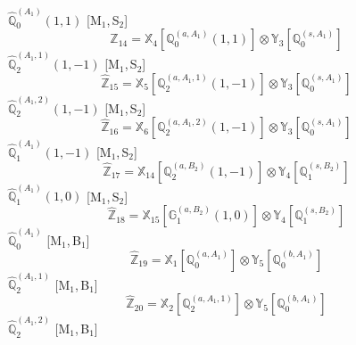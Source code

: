 \documentclass[fleqn,10pt,landscape]{article}
\begin{document}
\begin{itemize}
\noindent {} $\,\,\,\hat{\mathbb{Q}}_{0}^{(A_{1})}(1,1)$ [M$_{1}$,\,S$_{2}$]
\begin{dmath*}
\hat{\mathbb{Z}}_{14}=\mathbb{X}_{4}[\mathbb{Q}_{0}^{(a,A_{1})}(1,1)] \otimes\mathbb{Y}_{3}[\mathbb{Q}_{0}^{(s,A_{1})}]
\end{dmath*}
\vspace{4mm}
\noindent {} $\,\,\,\hat{\mathbb{Q}}_{2}^{(A_{1},1)}(1,-1)$ [M$_{1}$,\,S$_{2}$]
\begin{dmath*}
\hat{\mathbb{Z}}_{15}=\mathbb{X}_{5}[\mathbb{Q}_{2}^{(a,A_{1},1)}(1,-1)] \otimes\mathbb{Y}_{3}[\mathbb{Q}_{0}^{(s,A_{1})}]
\end{dmath*}
\vspace{4mm}
\noindent {} $\,\,\,\hat{\mathbb{Q}}_{2}^{(A_{1},2)}(1,-1)$ [M$_{1}$,\,S$_{2}$]
\begin{dmath*}
\hat{\mathbb{Z}}_{16}=\mathbb{X}_{6}[\mathbb{Q}_{2}^{(a,A_{1},2)}(1,-1)] \otimes\mathbb{Y}_{3}[\mathbb{Q}_{0}^{(s,A_{1})}]
\end{dmath*}
\vspace{4mm}
\noindent {} $\,\,\,\hat{\mathbb{Q}}_{1}^{(A_{1})}(1,-1)$ [M$_{1}$,\,S$_{2}$]
\begin{dmath*}
\hat{\mathbb{Z}}_{17}=\mathbb{X}_{14}[\mathbb{Q}_{2}^{(a,B_{2})}(1,-1)] \otimes\mathbb{Y}_{4}[\mathbb{Q}_{1}^{(s,B_{2})}]
\end{dmath*}
\vspace{4mm}
\noindent {} $\,\,\,\hat{\mathbb{Q}}_{1}^{(A_{1})}(1,0)$ [M$_{1}$,\,S$_{2}$]
\begin{dmath*}
\hat{\mathbb{Z}}_{18}=\mathbb{X}_{15}[\mathbb{G}_{1}^{(a,B_{2})}(1,0)] \otimes\mathbb{Y}_{4}[\mathbb{Q}_{1}^{(s,B_{2})}]
\end{dmath*}
\vspace{4mm}
\noindent {} $\,\,\,\hat{\mathbb{Q}}_{0}^{(A_{1})}$ [M$_{1}$,\,B$_{1}$]
\begin{dmath*}
\hat{\mathbb{Z}}_{19}=\mathbb{X}_{1}[\mathbb{Q}_{0}^{(a,A_{1})}] \otimes\mathbb{Y}_{5}[\mathbb{Q}_{0}^{(b,A_{1})}]
\end{dmath*}
\vspace{4mm}
\noindent {} $\,\,\,\hat{\mathbb{Q}}_{2}^{(A_{1},1)}$ [M$_{1}$,\,B$_{1}$]
\begin{dmath*}
\hat{\mathbb{Z}}_{20}=\mathbb{X}_{2}[\mathbb{Q}_{2}^{(a,A_{1},1)}] \otimes\mathbb{Y}_{5}[\mathbb{Q}_{0}^{(b,A_{1})}]
\end{dmath*}
\vspace{4mm}
\noindent {} $\,\,\,\hat{\mathbb{Q}}_{2}^{(A_{1},2)}$ [M$_{1}$,\,B$_{1}$]

\end{itemize}
\end{document}

